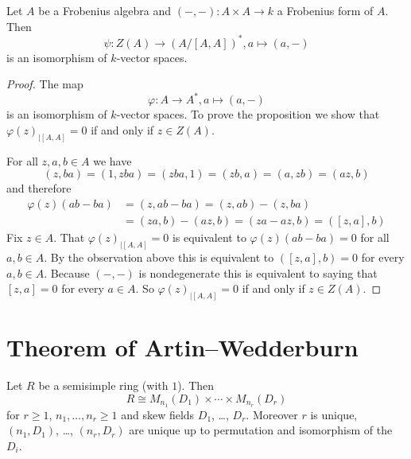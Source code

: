\begin{prop}
 Let $A$ be a Frobenius algebra and $(-,-) \colon A \times A \to k$ a Frobenius form of $A$. Then
 \[
  \psi \colon Z(A) \to (A/[A,A])^*, a \mapsto (a,-)
 \]
 is an isomorphism of $k$-vector spaces.
\end{prop}
\begin{proof}
 The map
 \[
  \varphi \colon A \to A^*, a \mapsto (a, -)
 \]
 is an isomorphism of $k$-vector spaces. To prove the proposition we show that $\varphi(z)_{|[A,A]} = 0$ if and only if $z \in Z(A)$.
 
 For all $z, a, b \in A$ we have
 \[
  (z,ba) = (1,zba) = (zba,1) = (zb,a) = (a,zb) = (az,b)
 \]
 and therefore
 \begin{align*}
  \varphi(z)(ab-ba)
  &= (z,ab-ba)
  = (z,ab) - (z,ba) \\
  &= (za,b) - (az,b)
  = (za-az,b)
  = ([z,a],b)
 \end{align*}
 Fix $z \in A$. That $\varphi(z)_{|[A,A]} = 0$ is equivalent to $\varphi(z)(ab-ba) = 0$ for all $a,b \in A$. By the observation above this is equivalent to $([z,a],b) = 0$ for every $a,b \in A$. Because $(-,-)$ is nondegenerate this is equivalent to saying that $[z,a] = 0$ for every $a \in A$. So $\varphi(z)_{|[A,A]} = 0$ if and only if $z \in Z(A)$.
\end{proof}





\section{Theorem of Artin--Wedderburn}


\begin{thrm}
 Let $R$ be a semisimple ring (with $1$). Then
 \[
  R \cong M_{n_1}(D_1) \times \dotsm \times M_{n_r}(D_r)
 \]
 for $r \geq 1$, $n_1, \dotsc, n_r \geq 1$ and skew fields $D_1$, \dots, $D_r$. Moreover $r$ is unique, $(n_1,D_1)$, \dots, $(n_r,D_r)$ are unique up to permutation and isomorphism of the $D_i$.
\end{thrm}













































